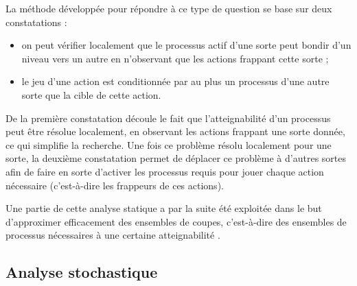La méthode développée pour répondre à ce type de question
se base sur deux constatations :
\begin{itemize}
  \item on peut vérifier localement que le processus actif d'une sorte peut
    bondir d'un niveau vers un autre en n'observant que les actions frappant cette sorte ;
  \item le jeu d'une action est conditionnée par au plus un processus d'une autre sorte
    que la cible de cette action.
\end{itemize}
De la première constatation découle le fait que l'atteignabilité d'un processus
peut être résolue localement, en observant les actions frappant une sorte donnée,
ce qui simplifie la recherche.
Une fois ce problème résolu localement pour une sorte, 
la deuxième constatation permet de déplacer ce problème
à d'autres sortes afin de faire en sorte d'activer les processus requis
pour jouer chaque action nécessaire (c'est-à-dire les frappeurs de ces actions).




\TODO




Une partie de cette analyse statique a par la suite été
exploitée dans le but d'approximer efficacement des ensembles de coupes,
c'est-à-dire des ensembles de processus nécessaires à une certaine atteignabilité
\cite{PAK13-CAV}.



\subsection{Analyse stochastique}


\newcommand{\stochainf}{{\small $\infty$}}
\newcommand{\stochaa}{$\mathbf{a}$}
\newcommand{\stochab}{$\mathbf{b}$}
\newcommand{\stochac}{$\mathbf{c}$}

